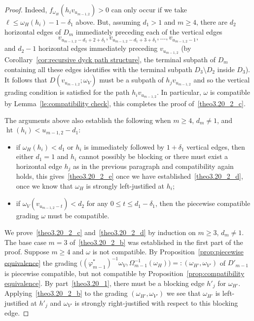 \documentclass[ALCO,ThmDefs,Unicode,epreuves]{cedram}
\DeclareMathOperator{\hgt}{ht}
\begin{document}
\begin{proof}
 Indeed, $f_{\omega_H}(h_iv_{u_{m-1,2}})>0$ can only occur if we take $\ell\le\omega_H(h_i)-1-\delta_1$ above.
 But, assuming $d_1>1$ and $m\ge4$, there are $d_2$ horizontal edges of $D_m$ immediately preceding each of the vertical edges 
 \[v_{u_{m-1,2}-d_1+2+\delta_1},v_{u_{m-1,2}-d_1+3+\delta_1},\ldots,v_{u_{m-1,2}-1},\]
 and $d_2-1$ horizontal edges immediately preceding $v_{u_{m-1,2}}$ (by Corollary~\ref{cor:recursive dyck path structure}, the terminal subpath of $D_m$ containing all these edges identifies with the terminal subpath $D_3\setminus D_2$ inside $D_3$). 
 It follows that $D(v_{u_{m-1,2}};\omega_V)$ must be a subpath of $h_jv_{u_{m-1,2}}$ and so the vertical grading condition is satisfied for the path $h_iv_{u_{m-1,2}}$. 
 In particular, $\omega$ is compatible by Lemma~\ref{le:compatibility check}, this completes the proof of~\ref{theo3.20_2_c}.

 The arguments above also establish the following when $m\ge4$, $d_m\ne1$, and $\hgt(h_i)<u_{m-1,2}-d_1$:
 \begin{itemize}
 \item if $\omega_H(h_i)<d_1$ or $h_i$ is immediately followed by $1+\delta_1$ vertical edges, then either $d_1=1$ and $h_i$ cannot possibly be blocking or there must exist a horizontal edge $h_j$ as in the previous paragraph and compatibility again holds, this gives~\ref{theo3.20_2_e} once we have established~\ref{theo3.20_2_d}, \ie once we know that $\omega_H$ is strongly left-justified at $h_i$; 
 \item if $\omega_V(v_{u_{m-1,2}-t})<d_2$ for any $0\le t\le d_1-\delta_1$, then the piecewise compatible grading $\omega$ must be compatible.
 \end{itemize}

 We prove~\ref{theo3.20_2_c} and~\ref{theo3.20_2_d} by induction on $m\ge3$, $d_m\ne1$.
 The base case $m=3$ of~\ref{theo3.20_2_b} was established in the first part of the proof.
 Suppose $m\ge4$ and $\omega$ is not compatible. 
 By Proposition~\ref{prop:piecewise equivalence} the grading $\big((\varphi^*_{m-1})^{-1}\omega_V,\Omega_{m-1}^{-1}(\omega_H)\big)=:(\omega_{H'},\omega_{V'})$ of $D'_{m-1}$ is piecewise compatible, but not compatible by Proposition~\ref{prop:compatibility equivalence}. 
 By part~\ref{theo3.20_1}, there must be a blocking edge $h'_j$ for $\omega_{H'}$.
 Applying~\ref{theo3.20_2_b} to the grading $(\omega_{H'},\omega_{V'})$ we see that $\omega_{H'}$ is left-justified at $h'_j$ and $\omega_{V'}$ is strongly right-justified with respect to this blocking edge.


\end{proof}
\end{document}

